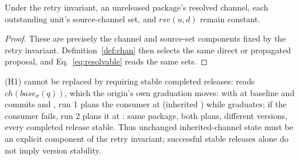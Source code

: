 \begin{lemma}
\label{lem:c}
Under the retry invariant, an unreleased package's resolved channel,
each outstanding unit's source-channel set, and
$\mathit{rsv}(u,d)$ remain constant.
\end{lemma}
\begin{proof}
These are precisely the channel and source-set components fixed by the
retry invariant. Definition~\ref{def:chan} then selects the same direct
or propagated proposal, and Eq.~\ref{eq:resolvable} reads the same sets.
\end{proof}

\begin{remarknum}
\label{rem:drift}
(H1) cannot be replaced by requiring stable completed releases:  reads
$\mathit{ch}(\mathit{base}_\sigma(q))$, which the origin's own
graduation moves: with  at baseline  and
commits  and
, run 1 plans the consumer at
 (inherited ) while 
graduates; if the consumer fails, run 2 plans it at :
same package, both plans, different versions, every completed release
stable. Thus unchanged inherited-channel state must be an explicit component of the
retry invariant; successful stable releases alone do not imply version stability.
\end{remarknum}

